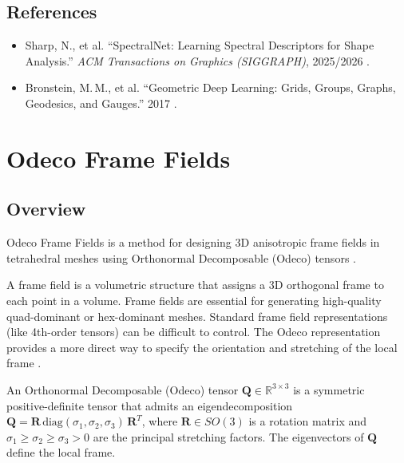 \subsection{References}
\begin{itemize}
  \item Sharp, N., et al. ``SpectralNet: Learning Spectral Descriptors for Shape Analysis.'' \textit{ACM Transactions on Graphics (SIGGRAPH)}, 2025/2026 \cite{sharp2025}.
  \item Bronstein, M.\,M., et al. ``Geometric Deep Learning: Grids, Groups, Graphs, Geodesics, and Gauges.'' 2017 \cite{bronstein2017}.
\end{itemize}

\section{Odeco Frame Fields}
\label{sec:odeco_frame_fields}

\subsection{Overview}
Odeco Frame Fields is a method for designing 3D anisotropic frame fields in tetrahedral meshes using Orthonormal Decomposable (Odeco) tensors \cite{zhu2025}.

A frame field is a volumetric structure that assigns a 3D orthogonal frame to each point in a volume. Frame fields are essential for generating high-quality quad-dominant or hex-dominant meshes. Standard frame field representations (like 4th-order tensors) can be difficult to control. The Odeco representation provides a more direct way to specify the orientation and stretching of the local frame \cite{panozzo2014}.

\begin{definition}\label{def:odeco_tensor}
An Orthonormal Decomposable (Odeco) tensor $\mathbf{Q} \in \mathbb{R}^{3 \times 3}$ is a symmetric positive-definite tensor that admits an eigendecomposition $\mathbf{Q} = \mathbf{R} \, \text{diag}(\sigma_1, \sigma_2, \sigma_3) \, \mathbf{R}^T$, where $\mathbf{R} \in SO(3)$ is a rotation matrix and $\sigma_1 \ge \sigma_2 \ge \sigma_3 > 0$ are the principal stretching factors. The eigenvectors of $\mathbf{Q}$ define the local frame.
\end{definition}

